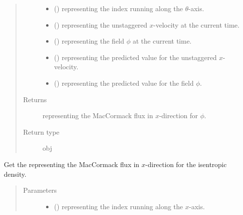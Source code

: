 \documentclass[letterpaper,10pt,english]{sphinxmanual}
\begin{document}
\begin{fulllineitems}
\begin{fulllineitems}
\begin{quote}
\begin{description}
\begin{itemize}
\item {} 
 () \textendash{}  representing the index running along the \(\theta\)-axis.

\item {} 
 () \textendash{}  representing the unstaggered \(x\)-velocity at the current time.

\item {} 
 () \textendash{}  representing the field \(\phi\) at the current time.

\item {} 
 () \textendash{}  representing the predicted value for the unstaggered \(x\)-velocity.

\item {} 
 () \textendash{}  representing the predicted value for the field \(\phi\).

\end{itemize}

\item[{Returns}] \leavevmode
{} representing the MacCormack flux in \(x\)-direction for \(\phi\).

\item[{Return type}] \leavevmode
obj

\end{description}\end{quote}

\end{fulllineitems}


\begin{fulllineitems}
\label{\detokenize{api:dycore.flux_isentropic_maccormack.FluxIsentropicMacCormack._get_maccormack_flux_x_s}}
Get the  representing the MacCormack flux in \(x\)-direction
for the isentropic density.
\begin{quote}\begin{description}
\item[{Parameters}] \leavevmode\begin{itemize}
\item {} 
 () \textendash{}  representing the index running along the \(x\)-axis.


\end{itemize}
\end{description}
\end{quote}
\end{fulllineitems}
\end{fulllineitems}
\end{document}
